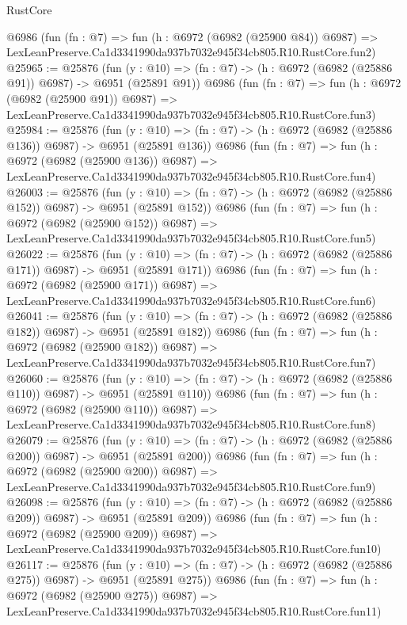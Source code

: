 \begin{lexlean}{RustCore}
\begin{coremodule}
    @6986
    (fun (fn : @7) =>
    fun (h : @6972 (@6982 (@25900 @84)) @6987) =>
    LexLeanPreserve.Ca1d3341990da937b7032e945f34cb805.R10.RustCore.fun2)
@25965 := @25876
    (fun (y : @10) => (fn : @7) -> (h : @6972 (@6982 (@25886 @91)) @6987) -> @6951 (@25891 @91))
    @6986
    (fun (fn : @7) =>
    fun (h : @6972 (@6982 (@25900 @91)) @6987) =>
    LexLeanPreserve.Ca1d3341990da937b7032e945f34cb805.R10.RustCore.fun3)
@25984 := @25876
    (fun (y : @10) => (fn : @7) -> (h : @6972 (@6982 (@25886 @136)) @6987) -> @6951 (@25891 @136))
    @6986
    (fun (fn : @7) =>
    fun (h : @6972 (@6982 (@25900 @136)) @6987) =>
    LexLeanPreserve.Ca1d3341990da937b7032e945f34cb805.R10.RustCore.fun4)
@26003 := @25876
    (fun (y : @10) => (fn : @7) -> (h : @6972 (@6982 (@25886 @152)) @6987) -> @6951 (@25891 @152))
    @6986
    (fun (fn : @7) =>
    fun (h : @6972 (@6982 (@25900 @152)) @6987) =>
    LexLeanPreserve.Ca1d3341990da937b7032e945f34cb805.R10.RustCore.fun5)
@26022 := @25876
    (fun (y : @10) => (fn : @7) -> (h : @6972 (@6982 (@25886 @171)) @6987) -> @6951 (@25891 @171))
    @6986
    (fun (fn : @7) =>
    fun (h : @6972 (@6982 (@25900 @171)) @6987) =>
    LexLeanPreserve.Ca1d3341990da937b7032e945f34cb805.R10.RustCore.fun6)
@26041 := @25876
    (fun (y : @10) => (fn : @7) -> (h : @6972 (@6982 (@25886 @182)) @6987) -> @6951 (@25891 @182))
    @6986
    (fun (fn : @7) =>
    fun (h : @6972 (@6982 (@25900 @182)) @6987) =>
    LexLeanPreserve.Ca1d3341990da937b7032e945f34cb805.R10.RustCore.fun7)
@26060 := @25876
    (fun (y : @10) => (fn : @7) -> (h : @6972 (@6982 (@25886 @110)) @6987) -> @6951 (@25891 @110))
    @6986
    (fun (fn : @7) =>
    fun (h : @6972 (@6982 (@25900 @110)) @6987) =>
    LexLeanPreserve.Ca1d3341990da937b7032e945f34cb805.R10.RustCore.fun8)
@26079 := @25876
    (fun (y : @10) => (fn : @7) -> (h : @6972 (@6982 (@25886 @200)) @6987) -> @6951 (@25891 @200))
    @6986
    (fun (fn : @7) =>
    fun (h : @6972 (@6982 (@25900 @200)) @6987) =>
    LexLeanPreserve.Ca1d3341990da937b7032e945f34cb805.R10.RustCore.fun9)
@26098 := @25876
    (fun (y : @10) => (fn : @7) -> (h : @6972 (@6982 (@25886 @209)) @6987) -> @6951 (@25891 @209))
    @6986
    (fun (fn : @7) =>
    fun (h : @6972 (@6982 (@25900 @209)) @6987) =>
    LexLeanPreserve.Ca1d3341990da937b7032e945f34cb805.R10.RustCore.fun10)
@26117 := @25876
    (fun (y : @10) => (fn : @7) -> (h : @6972 (@6982 (@25886 @275)) @6987) -> @6951 (@25891 @275))
    @6986
    (fun (fn : @7) =>
    fun (h : @6972 (@6982 (@25900 @275)) @6987) =>
    LexLeanPreserve.Ca1d3341990da937b7032e945f34cb805.R10.RustCore.fun11)

\end{coremodule}
\end{lexlean}
